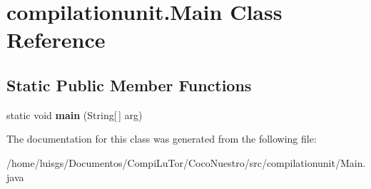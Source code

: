 \hypertarget{classcompilationunit_1_1_main}{
\section{compilationunit.Main Class Reference}
\label{classcompilationunit_1_1_main}
}
\subsection*{Static Public Member Functions}
\begin{DoxyCompactItemize}
\item 
\hypertarget{classcompilationunit_1_1_main_ac6da0f8ec01163ac0e1b7caf0b02f9fd}{
static void {\bfseries main} (String\mbox{[}$\,$\mbox{]} arg)}
\label{classcompilationunit_1_1_main_ac6da0f8ec01163ac0e1b7caf0b02f9fd}

\end{DoxyCompactItemize}


The documentation for this class was generated from the following file:\begin{DoxyCompactItemize}
\item 
/home/luisgs/Documentos/CompiLuTor/CocoNuestro/src/compilationunit/Main.java\end{DoxyCompactItemize}

